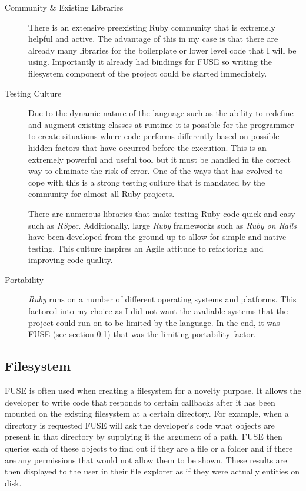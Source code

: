 \begin{description}

\item[Community \& Existing Libraries] \hfill

There is an extensive preexisting Ruby community that is extremely helpful and
active. The advantage of this in my case is that there are already many
libraries for the boilerplate or lower level code that I will be using.
Importantly it already had bindings for \ac{FUSE} so writing the filesystem
component of the project could be started immediately.

\item[Testing Culture] \hfill

Due to the dynamic nature of the language such as the ability to redefine and
augment existing classes at runtime it is possible for the programmer to create
situations where code performs differently based on possible hidden factors
that have occurred before the execution. This is an extremely powerful and
useful tool but it must be handled in the correct way to eliminate the risk of
error. One of the ways that has evolved to cope with this is a strong testing
culture that is mandated by the community for almost all Ruby projects.

There are numerous libraries that make testing Ruby code quick and easy such as
\emph{RSpec}. Additionally, large \emph{Ruby} frameworks such as \emph{Ruby on
Rails} have been developed from the ground up to allow for simple and native
testing. This culture inspires an Agile attitude to refactoring and improving
code quality.

\item[Portability] \hfill

\emph{Ruby} runs on a number of different operating systems and platforms. This
factored into my choice as I did not want the avaliable systems that the
project could run on to be limited by the language. In the end, it was
\ac{FUSE} (see section \ref{ssec:filesystem}) that was the limiting portability
factor.

\end{description}

\subsection{Filesystem}
\label{ssec:filesystem}

\ac{FUSE} is often used when creating a filesystem for a novelty purpose. It
allows the developer to write code that responds to certain callbacks after it
has been mounted on the existing filesystem at a certain directory. For
example, when a directory is requested \ac{FUSE} will ask the developer's code
what objects are present in that directory by supplying it the argument of
a path. \ac{FUSE} then queries each of these objects to find out if they are
a file or a folder and if there are any permissions that would not allow them
to be shown. These results are then displayed to the user in their file
explorer as if they were actually entities on disk.

